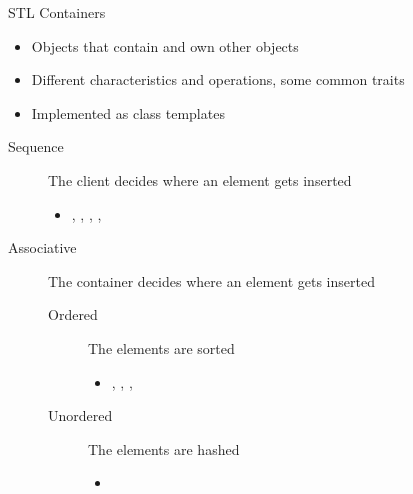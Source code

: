 \begin{frame}{STL Containers}

  \begin{itemize}
  \item Objects that contain and own other objects
  \item Different characteristics and operations, some common traits
  \item Implemented as class templates
  \end{itemize}

  \begin{description}
  \item[Sequence] The client decides where an element gets inserted
    \begin{itemize}
    \item {}, , , , 
    \end{itemize}
  \item[Associative] The container decides where an element gets
    inserted
    \begin{description}
    \item[Ordered] The elements are sorted
      \begin{itemize}
      \item {}, , , 
      \end{itemize}
    \item[Unordered] The elements are hashed
      \begin{itemize}
      \item {}
      \end{itemize}
    \end{description}
  \end{description}

\end{frame}

